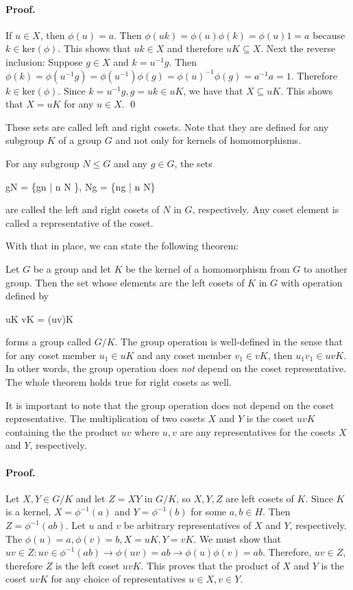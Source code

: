 \paragraph{Proof.} If $u \in X$, then $\phi(u) = a$. Then $\phi(uk) = \phi(u) \phi(k) = \phi(u) 1 = a$ because $k \in \text{ker}(\phi)$. This shows that $uk \in X$ and therefore $uK \subseteq X$. Next the reverse inclusion: Suppose $g \in X$ and $k = u^{-1}g$. Then $\phi(k) = \phi(u^{-1}g) = \phi(u^{-1}) \phi(g) = \phi(u)^{-1} \phi(g) = a^{-1}a = 1$. Therefore $k \in \text{ker}(\phi)$. Since $k=u^{-1}g, g = uk \in uK$, we have that $X \subseteq uK$. This shows that $X = uK$ for any $u \in X$. \qed

These sets are called left and right cosets. Note that they are defined for any subgroup $K$ of a group $G$ and not only for kernels of homomorphisms.

\begin{definition}[Cosets]
For any subgroup $N \leq G$ and any $g \in G$, the sets

\bee
gN = \{gn | n \in N \}, \quad Ng = \{ng | n  \in N\}
\eee

are called the left and right cosets of $N$ in $G$, respectively. Any coset element is called a representative of the coset.
\end{definition}

With that in place, we can state the following theorem: 

\begin{theorem}
Let $G$ be a group and let $K$ be the kernel of a homomorphism from $G$ to another group. Then the set whose elements are the left cosets of $K$ in $G$ with operation defined by

\bee
uK vK = (uv)K
\eee

forms a group called $G/K$. The group operation is well-defined in the sense that for any coset member $u_1 \in uK$ and any coset member $v_1 \in vK$, then $u_1 v_1 \in uvK$. In other words, the group operation does \emph{not} depend on the coset representative. The whole theorem holds true for right cosets as well.
\end{theorem}

It is important to note that the group operation does not depend on the coset representative. The multiplication of two cosets $X$ and $Y$ is the coset $uvK$ containing the the product $uv$ where $u,v$ are any representatives for the cosets $X$ and $Y$, respectively.

\paragraph{Proof.} Let $X,Y \in G/K$ and let $Z = XY$ in $G/K$, so $X,Y,Z$ are left cosets of $K$. Since $K$ is a kernel, $X = \phi^{-1}(a)$ and $Y = \phi^{-1}(b)$ for some $a,b \in H$. Then $Z = \phi^{-1}(ab)$. Let $u$ and $v$ be arbitrary representatives of $X$ and $Y$, respectively. The $\phi(u) = a, \phi(v) = b, X = uK, Y = vK$. We must show that $uv \in Z: uv \in \phi^{-1}(ab) \rightarrow \phi(uv) = ab \rightarrow \phi(u)\phi(v) = ab$. Therefore, $uv \in Z$, therefore $Z$ is the left coset $uvK$. This proves that the product of $X$ and $Y$ is the coset $uvK$ for any choice of representatives $u \in X, v \in Y$.

